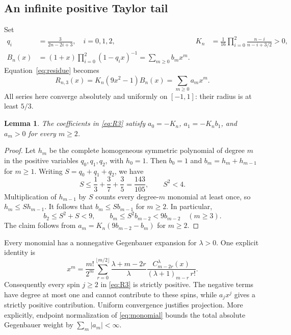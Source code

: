 \documentclass[11pt,a4paper]{article}
\newtheorem{lemma}[theorem]{Lemma}
\theoremstyle{remark}\newtheorem{remark}[theorem]{Remark}
\begin{document}
\subsection{An infinite positive Taylor tail}
Set
\begin{align}
 q_i&=\frac{3}{2n-2i+3},\quad i=0,1,2,
 &K_n&=\frac1{16}\prod_{i=0}^{2}\frac{n-i}{n-i+3/2}>0,\label{eq:q}\\
 B_n(x)&=(1+x)\prod_{i=0}^{2}(1-q_i x)^{-1}
 =\sum_{m\geq0}b_m x^m.
\end{align}
Equation~\eqref{eq:residue} becomes
\begin{equation}\label{eq:R3}
 R_{n,3}(x)=K_n(9x^2-1)B_n(x)=\sum_{m\geq0}a_m x^m.
\end{equation}
All series here converge absolutely and uniformly on $[-1,1]$: their radius is at least $5/3$.

\begin{lemma}\label{lem:tail}
The coefficients in \eqref{eq:R3} satisfy $a_0=-K_n$, $a_1=-K_n b_1$, and $a_m>0$ for every $m\geq2$.
\end{lemma}
\begin{proof}
Let $h_m$ be the complete homogeneous symmetric polynomial of degree $m$ in the positive variables $q_0,q_1,q_2$, with $h_0=1$. Then $b_0=1$ and $b_m=h_m+h_{m-1}$ for $m\geq1$. Writing $S=q_0+q_1+q_2$, we have
\begin{equation}\label{eq:S}
 S\leq\frac13+\frac37+\frac35=\frac{143}{105},\qquad S^2<4.
\end{equation}
Multiplication of $h_{m-1}$ by $S$ counts every degree-$m$ monomial at least once, so $h_m\leq S h_{m-1}$. It follows that $b_m\leq S b_{m-1}$ for $m\geq2$. In particular,
\begin{equation}
 b_2\leq S^2+S<9,\qquad
 b_m\leq S^2 b_{m-2}<9b_{m-2}\quad(m\geq3).
\end{equation}
The claim follows from $a_m=K_n(9b_{m-2}-b_m)$ for $m\geq2$.
\end{proof}

Every monomial has a nonnegative Gegenbauer expansion for $\lambda>0$. One explicit identity is \cite[Eq.~18.18.17]{DLMF}
\begin{equation}\label{eq:monomial}
 x^m=\frac{m!}{2^m}\sum_{r=0}^{\lfloor m/2\rfloor}
 \frac{\lambda+m-2r}{\lambda}
 \frac{C_{m-2r}^{\lambda}(x)}{(\lambda+1)_{m-r}\,r!}.
\end{equation}
Consequently every spin $j\geq2$ in \eqref{eq:R3} is strictly positive. The negative terms have degree at most one and cannot contribute to these spins, while $a_j x^j$ gives a strictly positive contribution. Uniform convergence justifies projection. More explicitly, endpoint normalization of \eqref{eq:monomial} bounds the total absolute Gegenbauer weight by $\sum_m|a_m|<\infty$.
\end{document}
